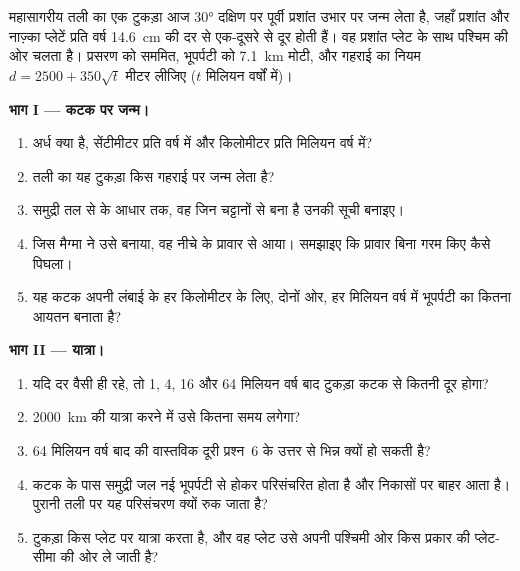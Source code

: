 \begin{problem}
\label{pb:g11:ocean-ridges:1}
महासागरीय तली का एक टुकड़ा आज \ang{30} दक्षिण पर पूर्वी प्रशांत उभार पर जन्म लेता है,
जहाँ प्रशांत और नाज़्का प्लेटें प्रति वर्ष \qty{14.6}{cm} की दर से एक-दूसरे से दूर होती हैं।
वह प्रशांत प्लेट के साथ पश्चिम की ओर चलता है। प्रसरण को सममित,
भूपर्पटी को \qty{7.1}{km} मोटी, और गहराई का नियम $d = 2500 + 350\sqrt{t}$ मीटर
लीजिए ($t$ मिलियन वर्षों में)।

\medskip
\noindent\textbf{भाग I --- कटक पर जन्म।}
\begin{enumerate}
  \item अर्ध  क्या है, सेंटीमीटर प्रति वर्ष में और
        किलोमीटर प्रति मिलियन वर्ष में?
  \item तली का यह टुकड़ा किस गहराई पर जन्म लेता है?
  \item समुद्री तल से  के आधार तक, वह जिन चट्टानों से बना है उनकी
        सूची बनाइए।
  \item जिस मैग्मा ने उसे बनाया, वह नीचे के प्रावार से आया। समझाइए कि
        प्रावार बिना गरम किए कैसे पिघला।
  \item यह कटक अपनी लंबाई के हर किलोमीटर के लिए, दोनों ओर, हर मिलियन वर्ष में
        भूपर्पटी का कितना आयतन बनाता है?
\end{enumerate}

\medskip
\noindent\textbf{भाग II --- यात्रा।}
\begin{enumerate}[resume]
  \item यदि दर वैसी ही रहे, तो 1, 4, 16 और 64
        मिलियन वर्ष बाद टुकड़ा कटक से कितनी दूर होगा?
  \item \qty{2000}{km} की यात्रा करने में उसे कितना समय लगेगा?
  \item 64 मिलियन वर्ष बाद की वास्तविक दूरी प्रश्न~6 के
        उत्तर से भिन्न क्यों हो सकती है?
  \item कटक के पास समुद्री जल नई भूपर्पटी से होकर परिसंचरित होता है और
        निकासों पर बाहर आता है। पुरानी तली पर यह परिसंचरण क्यों रुक जाता है?
  \item टुकड़ा किस प्लेट पर यात्रा करता है, और वह प्लेट उसे अपनी पश्चिमी ओर
        किस प्रकार की प्लेट-सीमा की ओर ले जाती है?
\end{enumerate}


\end{problem}
